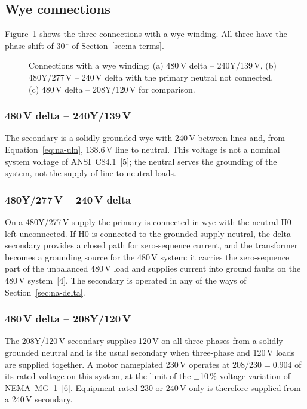 \subsection{Wye connections}
\label{sec:na-wye}

Figure~\ref{fig:na-wye} shows the three connections with a wye winding. All
three have the phase shift of 30\,$^{\circ}$ of Section~\ref{sec:na-terms}.

\begin{figure}[!ht]
  \centering
  
  \caption{Connections with a wye winding: (a) 480\,V delta -- 240Y/139\,V,
  (b) 480Y/277\,V -- 240\,V delta with the primary neutral not connected,
  (c) 480\,V delta -- 208Y/120\,V for comparison.}
  \label{fig:na-wye}
\end{figure}

\subsubsection{480\,V delta -- 240Y/139\,V}
The secondary is a solidly grounded wye with 240\,V between lines and,
from Equation~\eqref{eq:na-uln}, 138.6\,V line to neutral. This voltage is
not a nominal system voltage of ANSI~C84.1~[5]; the neutral serves the
grounding of the system, not the supply of line-to-neutral loads.

\subsubsection{480Y/277\,V -- 240\,V delta}
On a 480Y/277\,V supply the primary is connected in wye with the neutral H0
left unconnected. If H0 is connected to the grounded supply neutral, the
delta secondary provides a closed path for zero-sequence current, and the
transformer becomes a grounding source for the 480\,V system: it carries
the zero-sequence part of the unbalanced 480\,V load and supplies current
into ground faults on the 480\,V system~[4]. The secondary is
operated in any of the ways of Section~\ref{sec:na-delta}.

\subsubsection{480\,V delta -- 208Y/120\,V}
The 208Y/120\,V secondary supplies 120\,V on all three phases from a solidly
grounded neutral and is the usual secondary when three-phase and 120\,V
loads are supplied together. A motor nameplated 230\,V operates at
$208/230 = 0.904$ of its rated voltage on this system, at the limit of the
$\pm$10\,\% voltage variation of NEMA~MG~1~[6]. Equipment rated 230 or
240\,V only is therefore supplied from a 240\,V secondary.
\FloatBarrier
